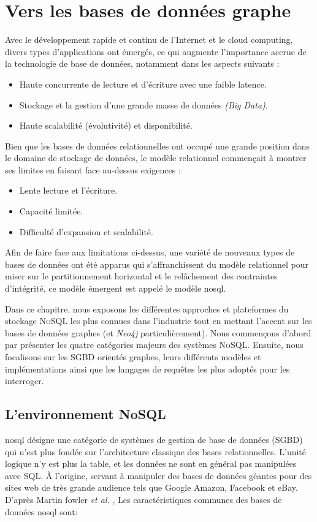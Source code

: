 \chapter{Vers les bases de données graphe}
\label{ch:graph-db}
Avec le développement rapide et continu de l'Internet et le cloud
computing, divers types d'applications ont émergés, ce qui augmente
l'importance accrue de la technologie de base de données, notamment
dans les aspects suivants \cite{han2011survey}:

\begin{itemize}
\item Haute concurrente de lecture et d'écriture avec une faible
  latence.
\item Stockage et la gestion d'une grande masse de données \emph{(Big
    Data)}.
\item Haute scalabilité (évolutivité) et disponibilité.
\end{itemize}

Bien que les bases de données relationnelles ont occupé une grande
position dans le domaine de stockage de données, le modèle relationnel
commençait à montrer ses limites en faisant face au-dessus exigences
\cite{han2011survey}:

\begin{itemize}
\item Lente lecture et l'écriture.
\item Capacité limitée.
\item Difficulté d'expansion et scalabilité.
\end{itemize}

Afin de faire face aux limitations ci-dessus, une variété de nouveaux
types de bases de données ont été apparus qui s'affranchissent du
modèle relationnel pour miser sur le partitionnement horizontal et le
relâchement des contraintes d'intégrité, ce modèle émergent est appelé
le modèle \acrshort{nosql}.

Dans ce chapitre, nous exposons les différentes approches et
plateformes du stockage \textsc{NoSQL} les plus connues dans
l'industrie tout en mettant l'accent sur les bases de données graphes
(et \emph{Neo4j} particulièrement). Nous commençons d'abord par
présenter les quatre catégories majeurs des systèmes
\textsc{NoSQL}. Ensuite, nous focalisons sur les \acrshort{SGBD}
orientés graphes, leurs différents modèles et implémentations ainsi
que les langages de requêtes les plus adoptés pour les interroger.

\section{L'environnement NoSQL}
\label{sec:nosql}
\acrshort{nosql} désigne une catégorie de systèmes de gestion de base
de données (\acrshort{SGBD}) qui n'est plus fondée sur l'architecture
classique des bases relationnelles. L'unité logique n'y est plus la
table, et les données ne sont en général pas manipulées avec
\textsc{SQL}. À l'origine, servant à manipuler des bases de données
géantes pour des sites web de très grande audience tels que Google
Amazon, Facebook et eBay. D'après Martin fowler \textit{et al.}
\cite{sadalage2012nosql}, Les caractéristiques communes des bases de
données \acrshort{nosql} sont:

